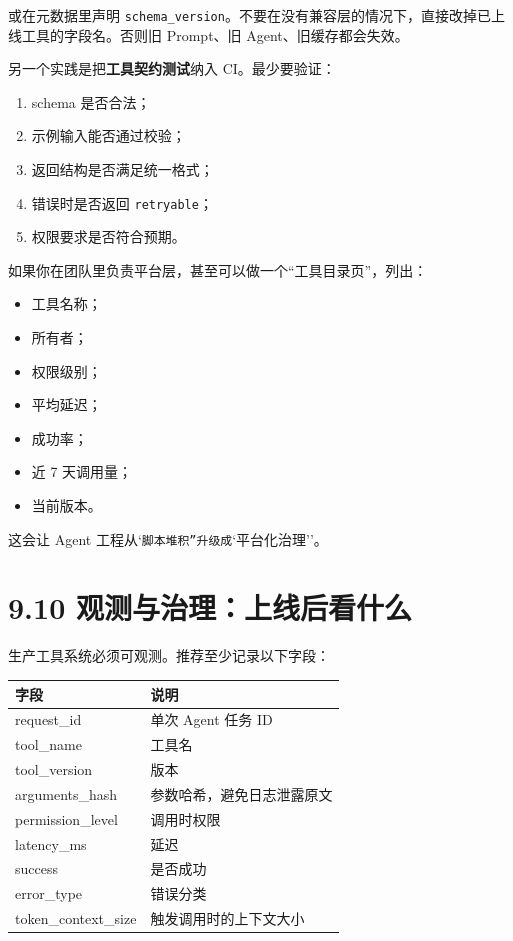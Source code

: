 或在元数据里声明 \texttt{schema\_version}。不要在没有兼容层的情况下，直接改掉已上线工具的字段名。否则旧 Prompt、旧 Agent、旧缓存都会失效。


另一个实践是把\textbf{工具契约测试}纳入 CI。最少要验证：


\begin{enumerate}[leftmargin=2em]
\item schema 是否合法；
\item 示例输入能否通过校验；
\item 返回结构是否满足统一格式；
\item 错误时是否返回 \texttt{retryable}；
\item 权限要求是否符合预期。
\end{enumerate}

如果你在团队里负责平台层，甚至可以做一个``工具目录页''，列出：


\begin{itemize}[leftmargin=2em]
\item 工具名称；
\item 所有者；
\item 权限级别；
\item 平均延迟；
\item 成功率；
\item 近 7 天调用量；
\item 当前版本。
\end{itemize}

这会让 Agent 工程从`\texttt{脚本堆积''升级成}`平台化治理''。


\section{9.10 观测与治理：上线后看什么}

生产工具系统必须可观测。推荐至少记录以下字段：


\begingroup
\scriptsize
\setlength{\tabcolsep}{3pt}
\begin{longtable}{|p{}|p{}|}
\hline
字段 & 说明 \\ \hline
request\_id & 单次 Agent 任务 ID \\ \hline
tool\_name & 工具名 \\ \hline
tool\_version & 版本 \\ \hline
arguments\_hash & 参数哈希，避免日志泄露原文 \\ \hline
permission\_level & 调用时权限 \\ \hline
latency\_ms & 延迟 \\ \hline
success & 是否成功 \\ \hline
error\_type & 错误分类 \\ \hline
token\_context\_size & 触发调用时的上下文大小 \\ \hline
\end{longtable}
\endgroup

